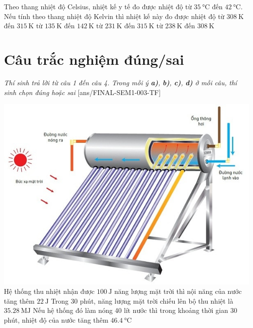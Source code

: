 \begin{ex}
Theo thang nhiệt độ Celsius, nhiệt kế y tế đo được nhiệt độ từ $\SI{35}{\celsius}$ đến $\SI{42}{\celsius}$. Nếu tính theo thang nhiệt độ Kelvin thì nhiệt kế này đo được nhiệt độ	
	\choice
	{\True từ $\SI{308}{\kelvin}$ đến $\SI{315}{\kelvin}$}
	{từ $\SI{135}{\kelvin}$ đến $\SI{142}{\kelvin}$}
	{từ $\SI{231}{\kelvin}$ đến $\SI{315}{\kelvin}$}
	{từ $\SI{238}{\kelvin}$ đến $\SI{308}{\kelvin}$}
	\loigiai{}
\end{ex}
\section{Câu trắc nghiệm đúng/sai} 
\textit{Thí sinh trả lời từ câu 1 đến câu 4. Trong mỗi ý \textbf{a)}, \textbf{b)}, \textbf{c)}, \textbf{d)} ở mỗi câu, thí sinh chọn đúng hoặc sai}
\setcounter{ex}{0}
[ans/FINAL-SEM1-003-TF]
\begin{ex}
	{\vspace{-0.75cm}\includegraphics[scale=0.2]{../figs/FINAL-SEM1-003-4}}
	{\True Hệ thống thu nhiệt nhận được $\SI{100}{\joule}$ năng lượng mặt trời thì nội năng của nước tăng thêm $\SI{22}{\joule}$}
	{\True Trong 30 phút, năng lượng mặt trời chiếu lên bộ thu nhiệt là $\SI{35.28}{\mega\joule}$}
	{\True Nếu hệ thống đó làm nóng 40 lít nước thì trong khoảng thời gian 30 phút, nhiệt độ của nước tăng thêm $\SI{46.4}{\celsius}$}
\end{ex}
